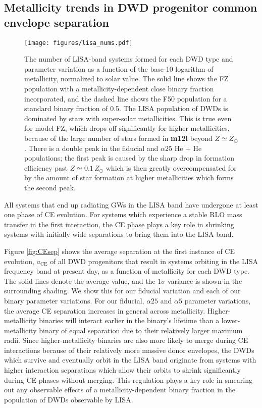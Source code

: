 \documentclass[twocolumn, linenumbers]{aastex631}
\begin{document}
\subsection{Metallicity trends in DWD progenitor common envelope 
separation}\label{sec:CEsep}

\begin{figure*}
	\texttt{[image: figures/lisa\_nums.pdf]}
    \caption{The number of LISA-band systems formed for each DWD type and 
parameter variation as a function of the base-10 logarithm of metallicity, 
normalized to solar value. The solid line shows the FZ population with a 
metallicity-dependent close binary fraction incorporated, and the dashed 
line shows the F50 population for a standard binary fraction of 0.5. The 
LISA population of DWDs is dominated by stars with super-solar 
metallicities. This is true even for model FZ, which drops off 
significantly for higher metallicities, because of the large number of 
stars formed in \textbf{m12i} beyond $Z\simeq Z_\odot$. There is a double 
peak in the fiducial and $\alpha25$ He + He populations; the first peak is 
caused by the sharp drop in formation efficiency past 
$Z\simeq0.1\,Z_\odot$ which is then greatly overcompensated for by the 
amount of star formation at higher metallicities which forms the second 
peak.}
    \label{fig:lisa_nums}
\end{figure*}

All systems that end up radiating GWs in the LISA band have undergone at 
least one phase of CE evolution. For systems which experience a stable RLO 
mass transfer in the first interaction, the CE phase plays a key role in 
shrinking systems with initially wide separations to bring them into the 
LISA band. 

Figure \ref{fig:CEsep} shows the average separation at the first instance 
of CE evolution, $a_{\text{CE}}$ of all DWD progenitors that result in 
systems orbiting in the LISA frequency band at present day, as a function 
of metallicity for each DWD type. The solid lines denote the average 
value, and the $1\sigma$ variance is shown in the surrounding shading. We 
show this for our fiducial variation and each of our binary parameter 
variations. For our fiducial, $\alpha25$ and $\alpha5$ parameter 
variations, the average CE separation increases in general across 
metallicity. Higher-metallicity binaries will interact earlier in the 
binary's lifetime than a lower-metallicity binary of equal separation due 
to their relatively larger maximum radii. Since higher-metallicity 
binaries are also more likely to merge during CE interactions because of 
their relatively more massive donor envelopes, the DWDs which survive and 
eventually orbit in the LISA band originate from systems with higher 
interaction separations which allow their orbits to shrink significantly 
during CE phases without merging. This regulation plays a key role in 
smearing out any observable effects of a metallicity-dependent binary 
fraction in the population of DWDs observable by LISA. 
\end{document}
